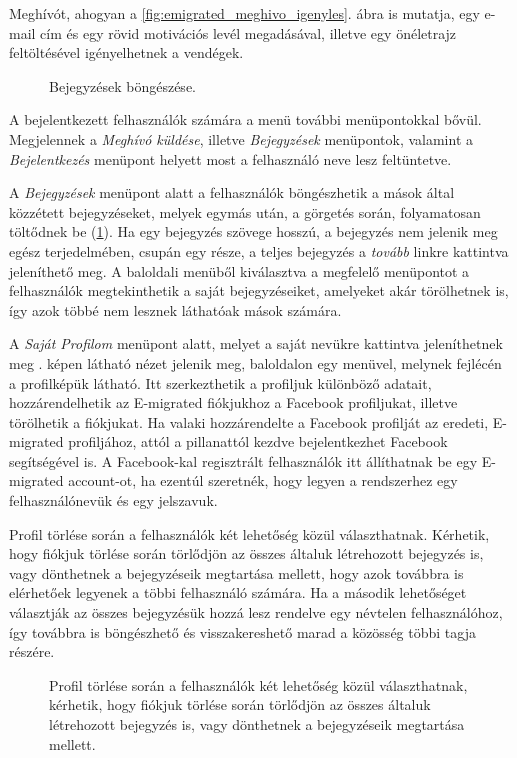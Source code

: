Meghívót, ahogyan a \ref{fig:emigrated_meghivo_igenyles}. ábra is mutatja, egy e-mail cím és egy rövid motivációs levél megadásával, illetve egy önéletrajz feltöltésével igényelhetnek a vendégek.
\begin{figure}[!b]
  \centering
  \caption{Bejegyzések böngészése.}
  \label{fig:osszes_bejegyzes}
\end{figure}



A bejelentkezett felhasználók számára a menü további menüpontokkal bővül. Megjelennek a \textsl{Meghívó küldése}, illetve \textsl{Bejegyzések} menüpontok, valamint a \textsl{Bejelentkezés} menüpont helyett most a felhasználó neve lesz feltüntetve. 


A \textsl{Bejegyzések} menüpont alatt a felhasználók böngészhetik a mások által közzétett bejegyzéseket, melyek egymás után, a görgetés során, folyamatosan töltődnek be (\ref{fig:osszes_bejegyzes}). Ha egy bejegyzés szövege hosszú, a bejegyzés nem jelenik meg egész terjedelmében, csupán egy része, a teljes bejegyzés a \textsl{tovább} linkre kattintva  jeleníthető meg. A baloldali menüből kiválasztva a megfelelő menüpontot a felhasználók megtekinthetik a saját bejegyzéseiket, amelyeket akár  törölhetnek is, így azok többé nem lesznek láthatóak mások számára.


A \textsl{Saját Profilom} menüpont alatt, melyet a saját nevükre kattintva jeleníthetnek meg . képen látható nézet jelenik meg, baloldalon egy menüvel, melynek fejlécén a profilképük látható. Itt szerkezthetik a profiljuk különböző adatait, hozzárendelhetik az E-migrated fiókjukhoz a Facebook profiljukat, illetve törölhetik a fiókjukat. Ha valaki hozzárendelte a Facebook profilját az eredeti, E-migrated profiljához, attól a pillanattól kezdve bejelentkezhet Facebook segítségével is. A Facebook-kal regisztrált felhasználók itt állíthatnak be egy E-migrated account-ot, ha ezentúl szeretnék, hogy legyen a rendszerhez egy felhasználónevük és egy jelszavuk.

Profil törlése során a felhasználók két lehetőség közül választhatnak. Kérhetik, hogy fiókjuk törlése során törlődjön az összes általuk létrehozott bejegyzés is, vagy dönthetnek a bejegyzéseik megtartása mellett, hogy azok továbbra is elérhetőek legyenek a többi felhasználó számára. Ha a második lehetőséget választják az összes bejegyzésük hozzá lesz rendelve egy névtelen felhasználóhoz, így továbbra is böngészhető és visszakereshető marad a közösség többi tagja részére.
\begin{figure}
  \centering
  \caption{Profil törlése során a felhasználók két lehetőség közül választhatnak, kérhetik, hogy fiókjuk törlése során törlődjön az összes általuk létrehozott bejegyzés is, vagy dönthetnek a bejegyzéseik megtartása mellett.}
  \label{fig:fiok_torlese}
\end{figure}

